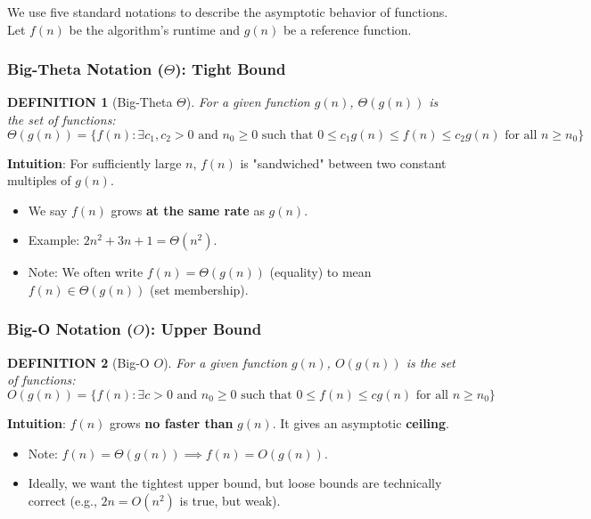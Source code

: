 \documentclass[12pt]{article}
\theoremstyle{blueplain}
\theoremstyle{bluedef}
\newtheorem{definition}{DEFINITION}[section]
\theoremstyle{blueremark}
\begin{document}
We use five standard notations to describe the asymptotic behavior of functions. Let $f(n)$ be the algorithm's runtime and $g(n)$ be a reference function.

\subsubsection{Big-Theta Notation ($\Theta$): Tight Bound}

\begin{definition}[Big-Theta $\Theta$]
    For a given function $g(n)$, $\Theta(g(n))$ is the set of functions:
    \[
        \Theta(g(n)) = \{ f(n) : \exists c_1, c_2 > 0 \text{ and } n_0 \ge 0 \text{ such that } 0 \le c_1 g(n) \le f(n) \le c_2 g(n) \text{ for all } n \ge n_0 \}
    \]
\end{definition}
\noindent \textbf{Intuition}: For sufficiently large $n$, $f(n)$ is "sandwiched" between two constant multiples of $g(n)$.
\begin{itemize}
    \item We say $f(n)$ grows \textbf{at the same rate} as $g(n)$.
    \item Example: $2n^2 + 3n + 1 = \Theta(n^2)$.
    \item Note: We often write $f(n) = \Theta(g(n))$ (equality) to mean $f(n) \in \Theta(g(n))$ (set membership).
\end{itemize}



\subsubsection{Big-O Notation ($O$): Upper Bound}

\begin{definition}[Big-O $O$]
    For a given function $g(n)$, $O(g(n))$ is the set of functions:
    \[
        O(g(n)) = \{ f(n) : \exists c > 0 \text{ and } n_0 \ge 0 \text{ such that } 0 \le f(n) \le c g(n) \text{ for all } n \ge n_0 \}
    \]
\end{definition}
\noindent \textbf{Intuition}: $f(n)$ grows \textbf{no faster than} $g(n)$. It gives an asymptotic \textbf{ceiling}.
\begin{itemize}
    \item Note: $f(n) = \Theta(g(n)) \implies f(n) = O(g(n))$.
    \item Ideally, we want the tightest upper bound, but loose bounds are technically correct (e.g., $2n = O(n^2)$ is true, but weak).
\end{itemize}
\end{document}
